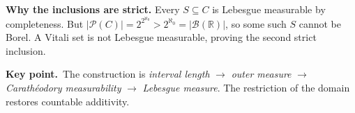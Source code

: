 \documentclass[10pt,a4paper]{article}
\newcommand{\R}{\mathbb R}
\newcommand{\B}{\mathcal B}
\newcommand{\key}[1]{\par\smallskip\textcolor{accent}{\textbf{Key point.}}\ #1\par}
\begin{document}
\textbf{Why the inclusions are strict.} Every $S\subseteq C$ is Lebesgue
measurable by completeness. But
$|\mathcal P(C)|=2^{2^{\aleph_0}}>2^{\aleph_0}=|\B(\R)|$,
so some such $S$ cannot be Borel. A Vitali set is not Lebesgue
measurable, proving the second strict inclusion.

\key{The construction is \emph{interval length} $\to$ \emph{outer measure}
$\to$ \emph{Carath\'eodory measurability} $\to$ \emph{Lebesgue measure}.
The restriction of the domain restores countable additivity.}
\end{document}
